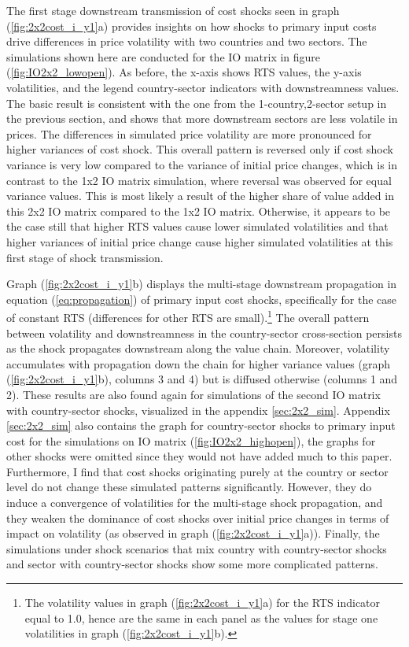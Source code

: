 The first stage downstream transmission of cost shocks seen in graph (\ref{fig:2x2cost_i_y1}a) provides insights on how shocks to primary input 
costs drive differences in price volatility with two countries and two sectors. The simulations shown here are conducted for the IO 
matrix in figure (\ref{fig:IO2x2_lowopen}). As before, the x-axis shows RTS values, the y-axis volatilities, and the legend country-sector
indicators with downstreamness values. The basic result is consistent with the one from the 1-country,2-sector 
setup in the previous section, and shows that more downstream sectors are less volatile in prices. The differences in simulated price 
volatility are more pronounced for higher variances of cost shock. This overall pattern is reversed only if cost shock variance is very 
low compared to the variance of initial price changes, which is in contrast to the 1x2 IO matrix simulation, where reversal was observed 
for equal variance values. This is most likely a result of the higher share of value added in this 2x2 IO matrix compared to the 1x2 
IO matrix. Otherwise, it appears to be the case still that higher RTS values cause lower simulated volatilities and that 
higher variances of initial price change cause higher simulated volatilities at this first stage of shock transmission. 

Graph (\ref{fig:2x2cost_i_y1}b) displays the multi-stage downstream propagation in equation (\ref{eq:propagation}) of primary input cost shocks, 
specifically for the case of constant RTS (differences for other RTS are small).\footnote{The volatility values in graph (\ref{fig:2x2cost_i_y1}a) 
for the RTS indicator equal to 1.0, hence are the same in each panel as the values for stage one volatilities in graph (\ref{fig:2x2cost_i_y1}b).}
The overall pattern 
between volatility and downstreamness in the country-sector cross-section persists as the shock propagates downstream along the value 
chain. Moreover, volatility accumulates with propagation down the chain for higher variance values (graph (\ref{fig:2x2cost_i_y1}b), 
columns 3 and 4) but is diffused otherwise (columns 1 and 2). These results are also found again for simulations of the second IO matrix 
with country-sector shocks, visualized in the appendix \ref{sec:2x2_sim}. Appendix \ref{sec:2x2_sim} also contains the graph for country-sector
shocks to primary input cost for the simulations on IO matrix (\ref{fig:IO2x2_highopen}), the graphs for other shocks were omitted since they 
would not have added much to this paper. Furthermore, I find that cost shocks 
originating purely at the country or sector level do not change these simulated patterns significantly. However, they do induce a 
convergence of volatilities for the multi-stage shock propagation, and they weaken the dominance of cost shocks over initial price 
changes in terms of impact on volatility (as observed in graph (\ref{fig:2x2cost_i_y1}a)). Finally, the simulations under shock scenarios 
that mix country with country-sector shocks and sector with country-sector shocks show some more complicated patterns.

